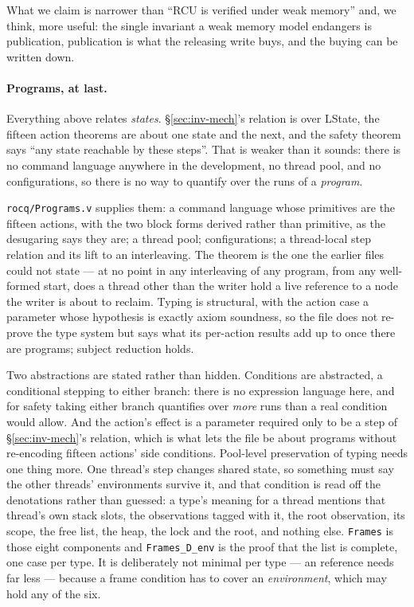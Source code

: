 What we claim is narrower than ``RCU is verified under weak memory'' and, we
think, more useful: the single invariant a weak memory model endangers is
publication, publication is what the releasing write buys, and the buying can
be written down.

\paragraph{Programs, at last.}
Everything above relates \emph{states}.  \S\ref{sec:inv-mech}'s relation is
over \textsf{LState}, the fifteen action theorems are about one state and the
next, and the safety theorem says ``any state reachable by these steps''.  That
is weaker than it sounds: there is no command language anywhere in the
development, no thread pool, and no configurations, so there is no way to
quantify over the runs of a \emph{program}.

\texttt{rocq/Programs.v} supplies them: a command language whose primitives are
the fifteen actions, with the two block forms derived rather than primitive, as
the desugaring says they are; a thread pool; configurations; a thread-local step
relation and its lift to an interleaving.  The theorem is the one the earlier
files could not state --- at no point in any interleaving of any program, from
any well-formed start, does a thread other than the writer hold a live
reference to a node the writer is about to reclaim.  Typing is structural, with
the action case a parameter whose hypothesis is exactly axiom soundness, so the
file does not re-prove the type system but says what its per-action results add
up to once there are programs; subject reduction holds.

Two abstractions are stated rather than hidden.  Conditions are abstracted, a
conditional stepping to either branch: there is no expression language here,
and for safety taking either branch quantifies over \emph{more} runs than a
real condition would allow.  And the action's effect is a parameter required
only to be a step of \S\ref{sec:inv-mech}'s relation, which is what lets the
file be about programs without re-encoding fifteen actions' side conditions.
Pool-level preservation of typing needs one thing more.  One thread's step
changes shared state, so something must say the other threads' environments
survive it, and that condition is read off the denotations rather than guessed:
a type's meaning for a thread mentions that thread's own stack slots, the
observations tagged with it, the root observation, its scope, the free list,
the heap, the lock and the root, and nothing else.  \texttt{Frames} is those
eight components and \texttt{Frames\_D\_env} is the proof that the list is
complete, one case per type.  It is deliberately not minimal per type --- an
\undf{} reference needs far less --- because a frame condition has to cover an
\emph{environment}, which may hold any of the six.

